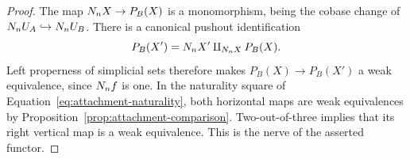 \begin{proof}
The map $N_n X\to P_B(X)$ is a monomorphism, being the
cobase change of $N_nU_{A}\hookrightarrow N_nU_{B}$.
There is a canonical pushout identification
\[
 P_B(X')=N_n X'\amalg_{N_n X}P_B(X).
\]
Left properness of simplicial sets therefore makes
$P_B(X)\to P_B(X')$ a weak equivalence, since $N_n f$ is one.
In the naturality square of Equation~\eqref{eq:attachment-naturality}, both horizontal
maps are weak equivalences by
Proposition~\ref{prop:attachment-comparison}.  Two-out-of-three
implies that its right vertical map is a weak equivalence.  This is
the nerve of the asserted functor.
\end{proof}
